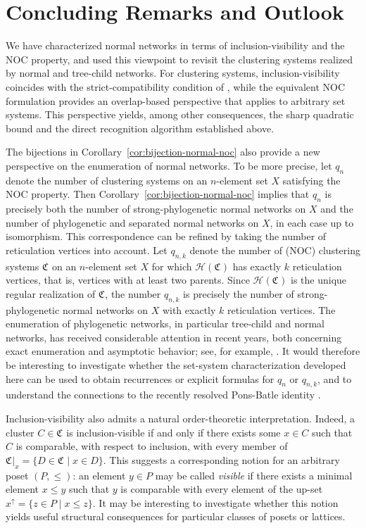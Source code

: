 \documentclass[preprint]{elsarticle}
\newcommand{\CS}[1][]{\ensuremath{\mathfrak{C}_{#1}}}
\newcommand{\Hasse}{\ensuremath{\mathcal{H}}}
\begin{document}
\section{Concluding Remarks and Outlook}
We have characterized normal networks in terms of inclusion-visibility and the NOC property,
and used this viewpoint to revisit the clustering systems realized by normal and tree-child
networks. For clustering systems, inclusion-visibility coincides with the strict-compatibility
condition of \cite{ALRR:14}, while the equivalent NOC formulation provides an overlap-based
perspective that applies to arbitrary set systems. This perspective yields, among other
consequences, the sharp quadratic bound and the direct recognition algorithm established above.


The bijections in Corollary~\ref{cor:bijection-normal-noc} also provide a new perspective on the
enumeration of normal networks.  To be more precise, let $q_n$ denote the number of clustering
systems on an $n$-element set $X$ satisfying the NOC property. Then
Corollary~\ref{cor:bijection-normal-noc} implies that $q_n$ is precisely both the number of
strong-phylogenetic normal networks on $X$ and the number of phylogenetic and separated normal
networks on $X$, in each case up to isomorphism.
This correspondence can be refined by taking the number of reticulation vertices into account.
Let $q_{n,k}$ denote the number of (NOC) clustering systems $\CS$ on an $n$-element set $X$ for
which $\Hasse(\CS)$ has exactly $k$ reticulation vertices, that is, vertices with at least two
parents. Since $\Hasse(\CS)$ is the unique regular realization of $\CS$, the number $q_{n,k}$ is
precisely the number of strong-phylogenetic normal networks on $X$ with exactly $k$ reticulation
vertices. The enumeration of phylogenetic networks, in particular tree-child and normal networks, 
has received considerable attention in recent years, both concerning exact enumeration and asymptotic
behavior; see, for example,
\cite{McDiarmid:2015,Fuchs:2019,Fuchs:2021A,Fuchs:2021B,Pons:2021}.
It would therefore be interesting to investigate whether the set-system characterization developed
here can be used to obtain recurrences or explicit formulas for $q_n$ or $q_{n,k}$, and to understand the connections to the recently resolved Pons-Batle identity \cite{Pons:2021,Liu:2026,Yu:2026}.


Inclusion-visibility also admits a natural order-theoretic interpretation. Indeed, a cluster
$C\in\CS$ is inclusion-visible if and only if there exists some $x\in C$ such that $C$ is
comparable, with respect to inclusion, with every member of $\CS|_x=\{D\in\CS\mid x\in D\}$. This
suggests a corresponding notion for an arbitrary poset $(P,\leq)$: an element $y\in P$ may be called
\emph{visible} if there exists a minimal element $x\leq y$ such that $y$ is comparable with every
element of the up-set $x^\uparrow=\{z\in P\mid x\leq z\}$. It may be interesting to investigate
whether this notion yields useful structural consequences for particular classes of posets or
lattices.
\end{document}
